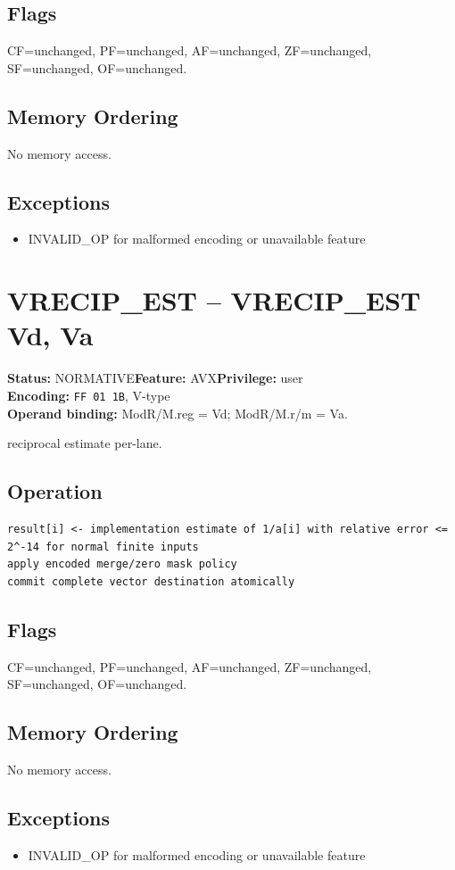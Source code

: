 \documentclass[10pt]{article}
\begin{document}
\subsection*{Flags}
CF=unchanged, PF=unchanged, AF=unchanged, ZF=unchanged, SF=unchanged, OF=unchanged.
\subsection*{Memory Ordering}
No memory access.
\subsection*{Exceptions}
\begin{itemize}
\item INVALID\_OP for malformed encoding or unavailable feature
\end{itemize}
\clearpage

\section{VRECIP\_EST -- VRECIP\_EST Vd, Va}
\textbf{Status:} NORMATIVE\quad \textbf{Feature:} AVX\quad \textbf{Privilege:} user\\
\textbf{Encoding:} \texttt{FF 01 1B}, V-type\\
\textbf{Operand binding:} ModR/M.reg = Vd; ModR/M.r/m = Va.

reciprocal estimate per-lane.

\subsection*{Operation}
\begin{lstlisting}
result[i] <- implementation estimate of 1/a[i] with relative error <= 2^-14 for normal finite inputs
apply encoded merge/zero mask policy
commit complete vector destination atomically
\end{lstlisting}
\subsection*{Flags}
CF=unchanged, PF=unchanged, AF=unchanged, ZF=unchanged, SF=unchanged, OF=unchanged.
\subsection*{Memory Ordering}
No memory access.
\subsection*{Exceptions}
\begin{itemize}
\item INVALID\_OP for malformed encoding or unavailable feature
\end{itemize}
\clearpage
\end{document}
